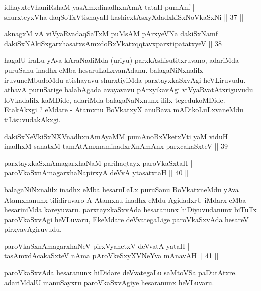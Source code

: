\begin{shl}
idhayxteV\s haniRshaM yasAmxdinadhxnAmA tataH pumAnf |\\
shurxteyxVha daqSoTxV\s tishayaH kashicxtAsxyXdadxkiSxNoV\s kaSxNi \hfill || 37 || 
\end{shl}

\begin{shl}
aknagxM vA viVyaRvadaqSaTxM puMsAM pArxyeVNa dakiSxNamf |\\
dakiSxNAkiSxgarxhasatxsAmxdoBxVkatxqqtavxparxtipatatxyeV \hfill || 38 || 
\end{shl}

\begin{artha}
hagalU iraLu yAva kAraNadiMda (uriyu) parxkAshisutitxruvano, adariMda puruSanu inadhx eMba hesaruLaLxvanAdanu. balagaNiNxnalilx iruvuneMbudoMdu atishayavu shurxtiyiMda parxtayxkaSxvAgi heVLiruvudu. athavA puruSarige balabAgada avayavavu pArxyikavAgi viVyaRvatAtxriguvudu loVkadalilx kaMDide, adariMda balagaNaNxnunx ililx tegedukoMDide. EtakAkxgi ? eMdare - Atamxnu BoVkatxyX anuBava mADikoLuLxvaneMdu tiLisuvudakAkxgi.
\end{artha}

\begin{shl}
dakiSxNeV\s kiSxNXVnadhxnAmA\s yaMM pumAnoBxVketxVti yaM viduH |\\
inadhxM sanatxM tamAtAmxnaminadxrXnAmAnx parxcakaSxteV \hfill || 39 || 
\end{shl}

\begin{shl}
parxtayxkaSxnAmagarxhaNaM parihaqtayx paroVkaSxtaH |\\
paroVkaSxnAmagarxhaNapirxyA deVvA ytasatxtaH \hfill || 40 || 
\end{shl}

\begin{artha}
balagaNiNxnalilx inadhx eMba hesaruLaLx puruSanu BoVkatxneMdu yAva Atamxnanunx tilidiruvaro A Atamxnu inadhx eMdu AgidadxrU iMdarx eMba hesariniMda kareyuvaru. parxtayxkaSxvAda hesaranunx hiDiyuvudanunx biTuTx paroVkaSxvAgi heVLuvaru, EkeMdare deVvategaLige paroVkaSxvAda hesareV pirxyavAgiruvudu.
\end{artha}

\begin{shl}
paroVkaSxnAmagarxhaNeV pirxVyanetxV deVvatA yataH |\\
tasAmxdAcakaSxteV nAma pAroVkeSxyXVNeYva mAnavAH \hfill || 41 || 
\end{shl}

\begin{artha}
paroVkaSxvAda hesaranunx hiDidare deVvategaLu saMtoVSa paDutAtxre. adariMdalU manuSayxru paroVkaSxvAgiye hesaranunx heVLuvaru.
\end{artha}

